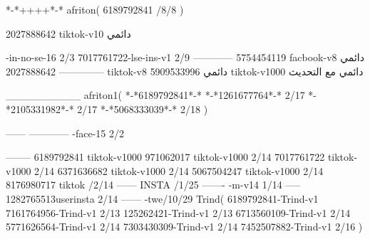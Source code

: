 *-*++++*-*
afriton(
6189792841 /8/8
)

2027888642 tiktok-v10
دائمي

-in-no-se-16 2/3
7017761722-lse-ins-v1 2/9
------------
5754454119 facbook-v8
دائمي
--------------
2027888642 tiktok-v8
دائمي
5909533996 tiktok-v1000
دائمي مع التحديث

__________
afriton1(
*-*6189792841*-*
*-*1261677764*-* 2/17
*-*2105331982*-* 2/17
*-*5068333039*-* 2/18
)

------
------------
-face-15 2/2

--------
6189792841 tiktok-v1000
971062017 tiktok-v1000 2/14
7017761722 tiktok-v1000 2/14
6371636682 tiktok-v1000 2/14
5067504247 tiktok-v1000 2/14
8176980717 tiktok /2/14
------
 INSTA /1/25
-------
-m-v14 1/14
-----
1282765513userinsta 2/14
------
-twe/10/29
Trind(
6189792841-Trind-v1 
7161764956-Trind-v1 2/13
125262421-Trind-v1 2/13
6713560109-Trind-v1 2/14
5771626564-Trind-v1 2/14
7303430309-Trind-v1 2/14
7452507882-Trind-v1 2/16
)
